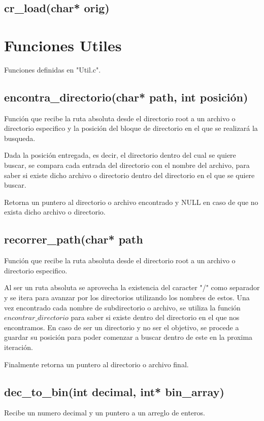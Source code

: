 \documentclass[12pt]{article}
\begin{document}
\subsection{cr\_load(char* orig)}

\section{Funciones Utiles}
Funciones definidas en "Util.c".

\subsection{encontra\_directorio(char* path, int posición)}
Función que recibe la ruta absoluta desde el directorio root a un archivo o directorio especifico y la posición del bloque de directorio en el que se realizará la busqueda. 

Dada la posición entregada, es decir, el directorio dentro del cual se quiere buscar, se compara cada entrada del directorio con el nombre del archivo, para saber si existe dicho archivo o directorio dentro del directorio en el que se quiere buscar. 

Retorna un puntero al directorio o archivo encontrado y NULL en caso de que no exista dicho archivo o directorio.

\subsection{recorrer\_path(char* path}
Función que recibe la ruta absoluta desde el directorio root a un archivo o directorio especifico.

Al ser un ruta absoluta se aprovecha la existencia del caracter "/" como separador y se itera para avanzar por los directorios utilizando los nombres de estos. Una vez encontrado cada nombre de subdirectorio o archivo, se utiliza la función $encontrar\_directorio$ para saber si existe dentro del directorio en el que nos encontramos. En caso de ser un directorio y no ser el objetivo, se procede a guardar su posición para poder comenzar a buscar dentro de este en la proxima iteración. 

Finalmente retorna un puntero al directorio o archivo final.

\subsection{dec\_to\_bin(int decimal, int* bin\_array)}
Recibe un numero decimal y un puntero a un arreglo de enteros.
\end{document}
